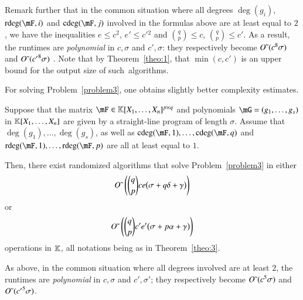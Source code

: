 
Remark further that in the common situation where all degrees $\deg(g_i)$,
$\rdeg(\mF,i)$ and $\cdeg(\mF,j)$ involved in the formulas above are at least
equal to $2$, we have the inequalities $e \le c^2$, $e' \le {c'}{}^2$ and
$\binom{q}{p}\leq c$, $\binom{q}{p}\leq c'$. As a result, the runtimes are {\em
  polynomial} in $c,\sigma$ and $c',\sigma$: they respectively become ${O}{\,\tilde{ }\,}
(c^8 \sigma)$ and ${O}{\,\tilde{ }\,} ({c'}^8 \sigma)$ . Note that by Theorem~\ref{theo:1}, 
that $\min(c,c')$ is an upper bound for the output size of
such~algorithms.

For solving Problem~\eqref{problem3}, one obtains slightly better
complexity estimates. 

\begin{theorem}\label{theo:3}
  Suppose that the matrix $\mF \in \KK[X_1,\dots,X_n]^{p \times q}$
  and polynomials $\mG=(g_1,\dots,g_s)$ in $\mathbb{K}[X_1,\dots,X_n]$ are
  given by a straight-line program of length $\sigma$. Assume that
  $\deg(g_1),\dots,\deg(g_s)$, as well as
  $\cdeg(\mF,1), \ldots, \cdeg(\mF,q)$ and
  $\rdeg(\mF,1), \ldots, \rdeg(\mF,p)$ are all at least equal to $1$.

  Then, there exist randomized algorithms that solve
  Problem~\eqref{problem3} in either
   $${O}{\,\tilde{ }\,}\left (
     {q \choose p} ce\big(\sigma + q \delta + \gamma  \big )
   \right)$$
or 
   $${O}{\,\tilde{ }\,}\left (
     {q \choose p} c'e'\big(\sigma + p \alpha  +\gamma \big )
   \right)$$
  operations in $\mathbb{K}$, 
  all notations being as in Theorem~\ref{theo:3}.
\end{theorem}
As above, in the common situation where all degrees involved are at
least $2$, the runtimes are {\it polynomial} in $c, \sigma$ and
$c',\sigma'$; they respectively become ${O}{\,\tilde{ }\,} (c^5 \sigma)$ and ${O}{\,\tilde{ }\,}
({c'}^5 \sigma)$.


